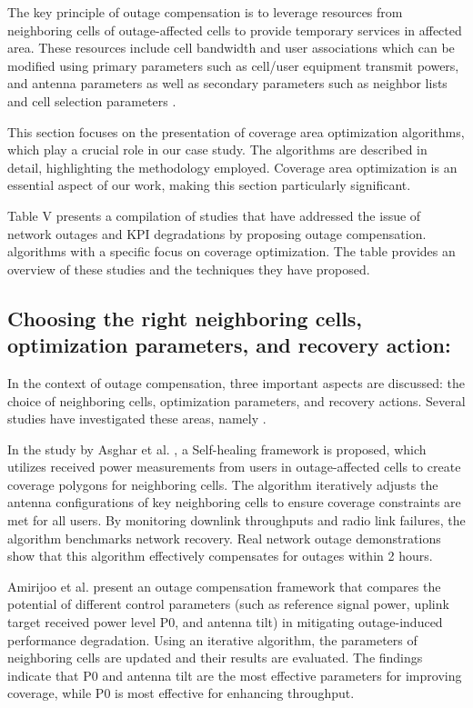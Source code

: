 The key principle of outage compensation is to leverage resources from neighboring cells of outage-affected cells to provide temporary services in affected area. These resources include cell bandwidth and user associations which can be modified using primary parameters such as cell/user equipment transmit powers, and antenna parameters as well as secondary parameters such as neighbor lists and cell selection parameters \cite{amirijoo2009cell}.

This section focuses on the presentation of coverage area optimization algorithms, which play a crucial role in our case study. The algorithms are described in detail, highlighting the methodology employed. Coverage area optimization is an essential aspect of our work, making this section particularly significant.

Table V presents a compilation of studies \cite{zoha2016learning,onireti2015cell,asghar2012self, amirijoo2011effectiveness, frenzel2012automated, jiang2013cell, wenjing2012centralized} that have addressed the issue of network outages and KPI degradations by proposing outage compensation. algorithms with a specific focus on coverage optimization. The table provides an overview of these studies and the techniques they have proposed.


\subsection{Choosing the right neighboring cells, optimization parameters, and recovery action:}

In the context of outage compensation, three important aspects are discussed: the choice of neighboring cells, optimization parameters, and recovery actions. Several studies have investigated these areas, namely \cite{asghar2012self,amirijoo2011effectiveness,frenzel2012automated}.

In the study by Asghar et al. \cite{asghar2012self}, a Self-healing framework is proposed, which utilizes received power measurements from users in outage-affected cells to create coverage polygons for neighboring cells. The algorithm iteratively adjusts the antenna configurations of key neighboring cells to ensure coverage constraints are met for all users. By monitoring downlink throughputs and radio link failures, the algorithm benchmarks network recovery. Real network outage demonstrations show that this algorithm effectively compensates for outages within 2 hours.

Amirijoo et al. \cite{amirijoo2011effectiveness} present an outage compensation framework that compares the potential of different control parameters (such as reference signal power, uplink target received power level P0, and antenna tilt) in mitigating outage-induced performance degradation. Using an iterative algorithm, the parameters of neighboring cells are updated and their results are evaluated. The findings indicate that P0 and antenna tilt are the most effective parameters for improving coverage, while P0 is most effective for enhancing throughput.

